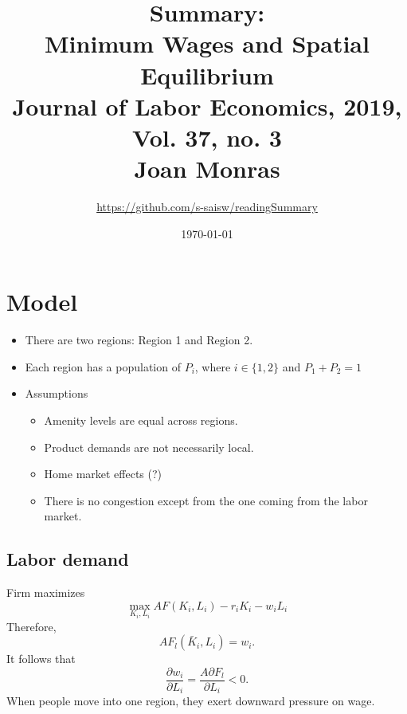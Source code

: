 \documentclass[a4paper, 12pt]{article}
\begin{document}
\pagestyle{fancy}
\setlength{\parindent}{5ex}
\setlength{\columnseprule}{0.5pt}

\title{Summary:
\\Minimum Wages and Spatial Equilibrium\\
\large Journal of Labor Economics, 2019, Vol. 37, no. 3 \\
\large Joan Monras
}
\author{\url{https://github.com/s-saisw/readingSummary}}
\date{\today}
\maketitle

\lhead{}

\section{Model}
\begin{itemize}
\item There are two regions: Region 1 and Region 2.
\item Each region has a population of $P_i$, where $i \in \{1,2\}$ and $P_1+P_2 = 1$
\item Assumptions
	\begin{itemize}
	\item Amenity levels are equal across regions.
	\item Product demands are not necessarily local.
	\item Home market effects (?)
	\item There is no congestion except from the one coming from the labor market.
	\end{itemize}

\end{itemize}

\subsection{Labor demand}
Firm maximizes
\begin{equation}
\max_{K_i,L_i} AF(K_i, L_i) - r_i K_i - w_i L_i
\end{equation}
Therefore,
\begin{equation}
AF_l(\bar{K}_i, L_i) = w_i.
\end{equation}
It follows that
\begin{equation}
\frac{\partial w_i}{\partial L_i} = \frac{A\partial F_l}{\partial L_i}<0.
\end{equation}
When people move into one region, they exert downward pressure on wage.
\end{document}
